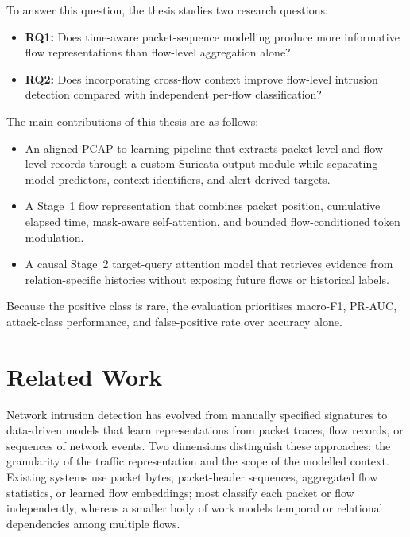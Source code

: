 \documentclass[11pt,fleqn]{report}
\begin{document}
To answer this question, the thesis studies two research questions:

\begin{itemize}
    \item \textbf{RQ1:} Does time-aware packet-sequence modelling produce more informative flow representations than flow-level aggregation alone?
    \item \textbf{RQ2:} Does incorporating cross-flow context improve flow-level intrusion detection compared with independent per-flow classification?
\end{itemize}

The main contributions of this thesis are as follows:

\begin{itemize}
    \item An aligned PCAP-to-learning pipeline that extracts packet-level and flow-level records through a custom Suricata output module while separating model predictors, context identifiers, and alert-derived targets.
    \item A Stage~1 flow representation that combines packet position, cumulative elapsed time, mask-aware self-attention, and bounded flow-conditioned token modulation.
    \item A causal Stage~2 target-query attention model that retrieves evidence from relation-specific histories without exposing future flows or historical labels.
\end{itemize}

Because the positive class is rare, the evaluation prioritises macro-F1, PR-AUC, attack-class performance, and false-positive rate over accuracy alone.

\chapter{Related Work}
\label{sec:related_work}

Network intrusion detection has evolved from manually specified signatures to data-driven models that learn representations from packet traces, flow records, or sequences of network events. Two dimensions distinguish these approaches: the granularity of the traffic representation and the scope of the modelled context. Existing systems use packet bytes, packet-header sequences, aggregated flow statistics, or learned flow embeddings; most classify each packet or flow independently, whereas a smaller body of work models temporal or relational dependencies among multiple flows.
\end{document}
